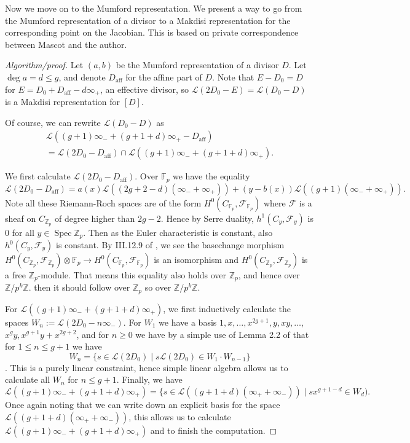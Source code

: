 \documentclass[12pt]{article}
\newcommand{\Z}{\mathbb{Z}}
\newcommand{\Fcal}{\mathcal{F}}
\newcommand{\Lcal}{\mathcal{L}}
\newcommand{\F}{\mathbb{F}}
\newcommand{\tensor}{\otimes}
\DeclareMathOperator{\Spec}{Spec}
\theoremstyle{plain}
\theoremstyle{definition}
\theoremstyle{remark}
\begin{document}
Now we move on to the Mumford representation. We present a way to go from the Mumford representation of a divisor to a Makdisi representation for the corresponding point on the Jacobian. This is based on private correspondence between Mascot and the author.
\begin{proof}[Algorithm/proof]
Let $(a,b)$ be the Mumford representation of a divisor $D$. Let $\deg a = d \leq g$, and denote $D_{\text{aff}}$ for the affine part of $D$. Note that $E-D_0 = D$ for $E = D_0 + D_{\text{aff}} - d\infty_+$, an effective divisor, so $\Lcal(2D_0 - E) = \Lcal(D_0 - D)$ is a Makdisi representation for $[D]$.

Of course, we can rewrite $\Lcal(D_0 -D)$ as 
\begin{multline*}
\Lcal((g+1)\infty_- + (g+1+d)\infty_+ - D_{\text{aff}}) \\= \Lcal(2D_0 - D_{\text{aff}} ) \cap \Lcal((g+1)\infty_- + (g+1+d)\infty_+).
\end{multline*}

We first calculate $\Lcal(2D_0 - D_{\text{aff}})$. Over $\F_p$ we have the equality
\[
\Lcal(2D_0 - D_{\text{aff}}) = a(x)\Lcal((2g+2-d)(\infty_- + \infty_+)) + (y-b(x))\Lcal((g+1)(\infty_- + \infty_+)).
\]
Note all these Riemann-Roch spaces are of the form $H^0(C_{\F_p},\Fcal_{\F_p})$ where $\Fcal$ is a sheaf on $C_{\Z_p}$ of degree higher than $2g-2$. Hence by Serre duality, $h^{1}(C_y,\Fcal_y)$ is $0$ for all $y \in \Spec \Z_p$. Then as the Euler characteristic is constant, also $h^{0}(C_y,\Fcal_y)$ is constant. By III.12.9 of \cite{hartshorne}, we see the basechange morphism $H^0(C_{\Z_p},\Fcal_{\Z_p}) \tensor \F_p \to H^0(C_{\F_p},\Fcal_{\F_p})$ is an isomorphism and $H^0(C_{\Z_p},\Fcal_{\Z_p})$ is a free $\Z_p$-module. That means this equality also holds over $\Z_p$, and hence over $\Z/p^k\Z$. then it should follow over $\Z_p$ so over $\Z/p^k\Z$.  

For $\Lcal((g+1)\infty_- + (g+1+d)\infty_+)$, we first inductively calculate the spaces $W_n := \Lcal(2D_0 - n\infty_-)$. For $W_1$ we have a basis $1,x,\dots,x^{2g+1},y,xy,\dots$, $x^g y, x^{g+1}y+x^{2g+2}$, and for $n \geq 0$ we have by a simple use of Lemma 2.2 of \cite{makdisi04} that for $1 \leq n \leq g+1$ we have \[W_{n} = \{s \in \Lcal(2D_0) \mid s\Lcal(2D_0) \in W_1 \cdot W_{n-1}\}\]. This is a purely linear constraint, hence simple linear algebra allows us to calculate all $W_n$ for $n \leq g+1$. Finally, we have
\[
\Lcal((g+1)\infty_- + (g+1+d)\infty_+) = \{ s \in \Lcal((g+1+d)(\infty_+ + \infty_-)) \mid sx^{g+1-d} \in W_d).
\] 
Once again noting that we can write down an explicit basis for the space $\Lcal((g+1+d)(\infty_+ + \infty_-))$, this allows us to calculate $\Lcal((g+1)\infty_- + (g+1+d)\infty_+)$ and to finish the computation.
\end{proof}
\end{document}
